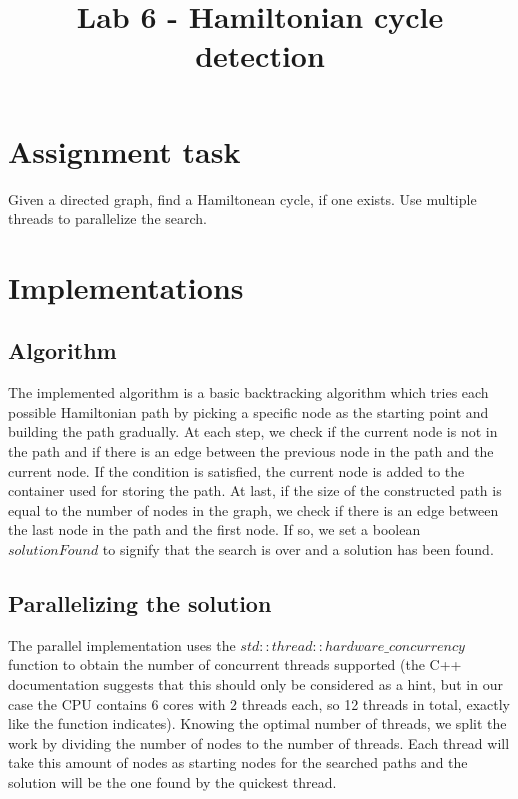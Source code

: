 \documentclass[journal, onecolumn, 12pt]{IEEEtran}
\begin{document}
\title{Lab 6 - Hamiltonian cycle detection\\
}

\author{
}

\maketitle

\section{Assignment task}
Given a directed graph, find a Hamiltonean cycle, if one exists. Use multiple threads to parallelize the search.

\section{Implementations}
\subsection{Algorithm}
The implemented algorithm is a basic backtracking algorithm which tries each possible Hamiltonian path by picking a specific node as the starting point and building the path gradually. At each step, we check if the current node is not in the path and if there is an edge between the previous node in the path and the current node. If the condition is satisfied, the current node is added to the container used for storing the path. At last, if the size of the constructed path is equal to the number of nodes in the graph, we check if there is an edge between the last node in the path and the first node. If so, we set a boolean $ solutionFound $ to signify that the search is over and a solution has been found.

\subsection{Parallelizing the solution}
The parallel implementation uses the $ std::thread::hardware\_concurrency $ function to obtain the number of concurrent threads supported (the C++ documentation suggests that this should only be considered as a hint, but in our case the CPU contains 6 cores with 2 threads each, so 12 threads in total, exactly like the function indicates). Knowing the optimal number of threads, we split the work by dividing the number of nodes to the number of threads. Each thread will take this amount of nodes as starting nodes for the searched paths and the solution will be the one found by the quickest thread. 
\end{document}
